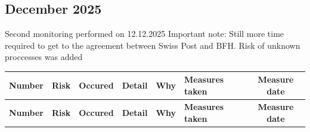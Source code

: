 \begin{landscape}
\subsection*{December 2025 }
Second monitoring performed on 12.12.2025
Important note: Still more time required to get to the agreement between Swiss Post and BFH. Risk of unknown proccesses was added

\begin{longtable}{|c|p{4cm}|c|p{3cm}|p{3cm}|p{3cm}|c|}
\hline
\textbf{Number} & \textbf{Risk} & \textbf{Occured} & \textbf{Detail} & \textbf{Why} & \textbf{Measures taken} & \textbf{Measure date} \\ \hline
\endfirsthead

\hline
\textbf{Number} & \textbf{Risk} & \textbf{Occured} & \textbf{Detail} & \textbf{Why} & \textbf{Measures taken} & \textbf{Measure date} \\ \hline
\endhead


\end{longtable}
\end{landscape}
